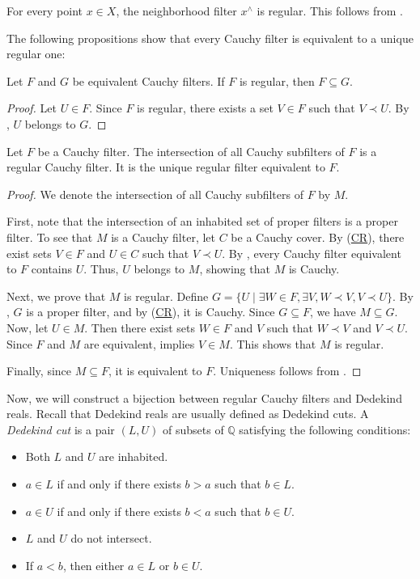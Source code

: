 \documentclass[pdflatex,sn-mathphys-num]{sn-jnl}
\newcommand{\axitem}[1]{\phantomsection \label{ax:#1}}
\newcommand{\axref}[1]{(\hyperref[ax:#1]{#1})}
\theoremstyle{definition}
\theoremstyle{remark}
\numberwithin{figure}{section}
\newcommand{\rb}{\prec}
\begin{document}
\begin{example}
For every point $x \in X$, the neighborhood filter $x^\wedge$ is regular.
This follows from .
\end{example}

The following propositions show that every Cauchy filter is equivalent to a unique regular one:

\begin{prop}
Let $F$ and $G$ be equivalent Cauchy filters.
If $F$ is regular, then $F \subseteq G$.
\end{prop}
\begin{proof}
Let $U \in F$.
Since $F$ is regular, there exists a set $V \in F$ such that $V \rb U$.
By , $U$ belongs to $G$.
\end{proof}

\begin{prop}
Let $F$ be a Cauchy filter.
The intersection of all Cauchy subfilters of $F$ is a regular Cauchy filter.
It is the unique regular filter equivalent to $F$.
\end{prop}
\begin{proof}
We denote the intersection of all Cauchy subfilters of $F$ by $M$.

First, note that the intersection of an inhabited set of proper filters is a proper filter.
To see that $M$ is a Cauchy filter, let $C$ be a Cauchy cover.
By \axref{CR}, there exist sets $V \in F$ and $U \in C$ such that $V \rb U$.
By , every Cauchy filter equivalent to $F$ contains $U$.
Thus, $U$ belongs to $M$, showing that $M$ is Cauchy.

Next, we prove that $M$ is regular.
Define $G = \{ U \mid \exists W \in F, \exists V, W \rb V, V \rb U \}$.
By , $G$ is a proper filter, and by \axref{CR}, it is Cauchy.
Since $G \subseteq F$, we have $M \subseteq G$.
Now, let $U \in M$.
Then there exist sets $W \in F$ and $V$ such that $W \rb V$ and $V \rb U$.
Since $F$ and $M$ are equivalent,  implies $V \in M$.
This shows that $M$ is regular.

Finally, since $M \subseteq F$, it is equivalent to $F$.
Uniqueness follows from .
\end{proof}

Now, we will construct a bijection between regular Cauchy filters and Dedekind reals.
Recall that Dedekind reals are usually defined as Dedekind cuts.
A \emph{Dedekind cut} is a pair $(L,U)$ of subsets of $\mathbb{Q}$ satisfying the following conditions:
\begin{itemize}[(DI)]
\item[(DI)] \axitem{DI} Both $L$ and $U$ are inhabited.
\item[(DL)] \axitem{DL} $a \in L$ if and only if there exists $b > a$ such that $b \in L$.
\item[(DU)] \axitem{DU} $a \in U$ if and only if there exists $b < a$ such that $b \in U$.
\item[(DD)] \axitem{DD} $L$ and $U$ do not intersect.
\item[(DS)] \axitem{DS} If $a < b$, then either $a \in L$ or $b \in U$.
\end{itemize}
\end{document}
